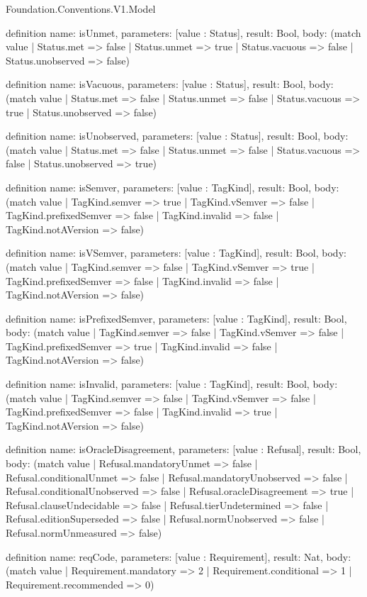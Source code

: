 \begin{lexlean}{Foundation.Conventions.V1.Model}
\begin{semanticmodule}
definition{
  name: isUnmet,
  parameters: [value : Status],
  result: Bool,
  body: (match value
    | Status.met => false
    | Status.unmet => true
    | Status.vacuous => false
    | Status.unobserved => false)
}

definition{
  name: isVacuous,
  parameters: [value : Status],
  result: Bool,
  body: (match value
    | Status.met => false
    | Status.unmet => false
    | Status.vacuous => true
    | Status.unobserved => false)
}

definition{
  name: isUnobserved,
  parameters: [value : Status],
  result: Bool,
  body: (match value
    | Status.met => false
    | Status.unmet => false
    | Status.vacuous => false
    | Status.unobserved => true)
}

definition{
  name: isSemver,
  parameters: [value : TagKind],
  result: Bool,
  body: (match value
    | TagKind.semver => true
    | TagKind.vSemver => false
    | TagKind.prefixedSemver => false
    | TagKind.invalid => false
    | TagKind.notAVersion => false)
}

definition{
  name: isVSemver,
  parameters: [value : TagKind],
  result: Bool,
  body: (match value
    | TagKind.semver => false
    | TagKind.vSemver => true
    | TagKind.prefixedSemver => false
    | TagKind.invalid => false
    | TagKind.notAVersion => false)
}

definition{
  name: isPrefixedSemver,
  parameters: [value : TagKind],
  result: Bool,
  body: (match value
    | TagKind.semver => false
    | TagKind.vSemver => false
    | TagKind.prefixedSemver => true
    | TagKind.invalid => false
    | TagKind.notAVersion => false)
}

definition{
  name: isInvalid,
  parameters: [value : TagKind],
  result: Bool,
  body: (match value
    | TagKind.semver => false
    | TagKind.vSemver => false
    | TagKind.prefixedSemver => false
    | TagKind.invalid => true
    | TagKind.notAVersion => false)
}

definition{
  name: isOracleDisagreement,
  parameters: [value : Refusal],
  result: Bool,
  body: (match value
    | Refusal.mandatoryUnmet => false
    | Refusal.conditionalUnmet => false
    | Refusal.mandatoryUnobserved => false
    | Refusal.conditionalUnobserved => false
    | Refusal.oracleDisagreement => true
    | Refusal.clauseUndecidable => false
    | Refusal.tierUndetermined => false
    | Refusal.editionSuperseded => false
    | Refusal.normUnobserved => false
    | Refusal.normUnmeasured => false)
}

definition{
  name: reqCode,
  parameters: [value : Requirement],
  result: Nat,
  body: (match value
    | Requirement.mandatory => 2
    | Requirement.conditional => 1
    | Requirement.recommended => 0)
}


\end{semanticmodule}
\end{lexlean}
